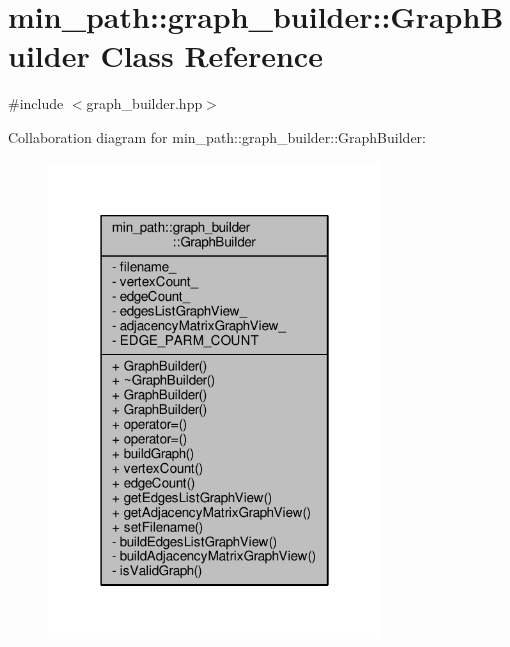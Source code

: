 \hypertarget{a00007}{}\section{min\+\_\+path\+:\+:graph\+\_\+builder\+:\+:Graph\+Builder Class Reference}
\label{a00007}


{\ttfamily \#include $<$graph\+\_\+builder.\+hpp$>$}



Collaboration diagram for min\+\_\+path\+:\+:graph\+\_\+builder\+:\+:Graph\+Builder\+:
\nopagebreak
\begin{figure}[H]
\begin{center}
\leavevmode
\includegraphics[width=250pt]{d2/d1f/a00083}
\end{center}
\end{figure}
